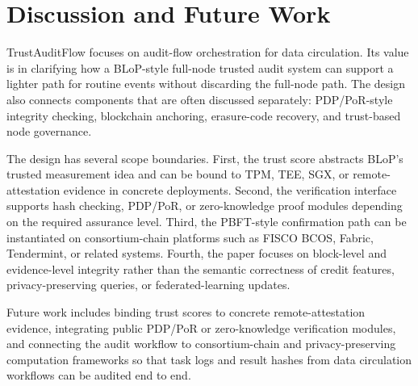 \section{Discussion and Future Work}

TrustAuditFlow focuses on audit-flow orchestration for data circulation. Its value is in clarifying how a BLoP-style full-node trusted audit system can support a lighter path for routine events without discarding the full-node path. The design also connects components that are often discussed separately: PDP/PoR-style integrity checking, blockchain anchoring, erasure-code recovery, and trust-based node governance.

The design has several scope boundaries. First, the trust score abstracts BLoP's trusted measurement idea and can be bound to TPM, TEE, SGX, or remote-attestation evidence in concrete deployments. Second, the verification interface supports hash checking, PDP/PoR, or zero-knowledge proof modules depending on the required assurance level. Third, the PBFT-style confirmation path can be instantiated on consortium-chain platforms such as FISCO BCOS, Fabric, Tendermint, or related systems. Fourth, the paper focuses on block-level and evidence-level integrity rather than the semantic correctness of credit features, privacy-preserving queries, or federated-learning updates.

Future work includes binding trust scores to concrete remote-attestation evidence, integrating public PDP/PoR or zero-knowledge verification modules, and connecting the audit workflow to consortium-chain and privacy-preserving computation frameworks so that task logs and result hashes from data circulation workflows can be audited end to end.
